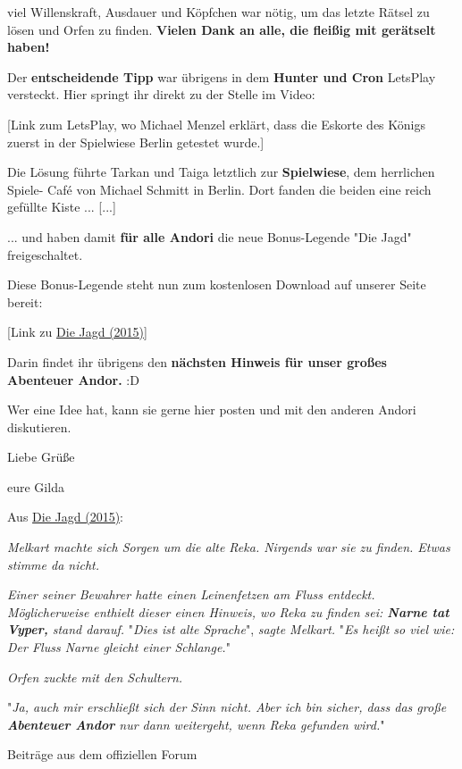 \documentclass[10pt, a4paper, oneside]{book}
\newcommand{\reflegende}[1]{\hyperref[Legende: #1]{#1}}
\newcommand{\bildmitts}[2][height=0.32\textwidth,width=0.48\textwidth,keepaspectratio]{%
    \begin{center}
        \texttt{[image: Chronik der Andorversen/Bilder/\#2]}
    \end{center}
}
\begin{document}
\begin{multicols}{2}
viel Willenskraft, Ausdauer und Köpfchen war nötig, um das letzte Rätsel zu lösen und Orfen zu finden. \textbf{Vielen Dank an alle, die fleißig mit gerätselt haben!}

Der \textbf{entscheidende Tipp} war übrigens in dem \textbf{Hunter und Cron} LetsPlay versteckt. Hier springt ihr direkt zu der Stelle im Video:

[Link zum LetsPlay, wo Michael Menzel erklärt, dass die Eskorte des Königs zuerst in der Spielwiese Berlin getestet wurde.]

Die Lösung führte Tarkan und Taiga letztlich zur \textbf{Spielwiese}, dem herrlichen Spiele- Café von Michael Schmitt in Berlin. Dort fanden die beiden eine reich gefüllte Kiste ... [...]

... und haben damit \textbf{für alle Andori} die neue Bonus-Legende "Die Jagd" freigeschaltet.


Diese Bonus-Legende steht nun zum kostenlosen Download auf unserer Seite bereit:

[Link zu \reflegende{Die Jagd (2015)}]

Darin findet ihr übrigens den \textbf{nächsten Hinweis für unser großes Abenteuer Andor.} :D

Wer eine Idee hat, kann sie gerne hier posten und mit den anderen Andori diskutieren.


Liebe Grüße

eure Gilda

\begin{center}
    Aus \reflegende{Die Jagd (2015)}:
\end{center}



\textit{Melkart machte sich Sorgen um die alte Reka. Nirgends war sie zu finden. Etwas stimme da nicht.}

\textit{Einer seiner Bewahrer hatte einen Leinenfetzen am Fluss entdeckt. Möglicherweise enthielt dieser einen Hinweis, wo Reka zu finden sei: \textbf{Narne tat Vyper,} stand darauf.} "\textit{Dies ist alte Sprache}", \textit{sagte Melkart.} "\textit{Es heißt so viel wie: Der Fluss Narne gleicht einer Schlange.}"

\textit{Orfen zuckte mit den Schultern.}

"\textit{Ja, auch mir erschließt sich der Sinn nicht. Aber ich bin sicher, dass das große \textbf{Abenteuer Andor} nur dann weitergeht, wenn Reka gefunden wird.}"

\begin{center}
    Beiträge aus dem offiziellen Forum


\end{center}
\end{multicols}
\end{document}
